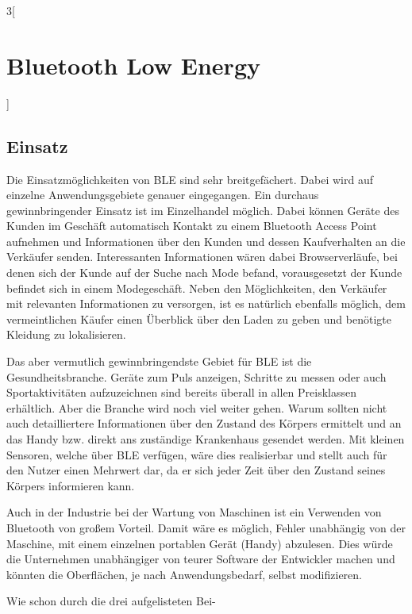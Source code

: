 \begin{multicols}{3}[\section{Bluetooth Low Energy}]
\subsection*{Einsatz}
Die Einsatzmöglichkeiten von BLE sind sehr breitgefächert. Dabei wird auf einzelne Anwendungsgebiete genauer eingegangen. Ein durchaus gewinnbringender Einsatz ist im Einzelhandel möglich. Dabei können Geräte des Kunden im Geschäft automatisch Kontakt zu einem Bluetooth Access Point aufnehmen und Informationen über den Kunden und dessen Kaufverhalten an die Verkäufer senden. Interessanten Informationen wären dabei Browserverläufe, bei denen sich der Kunde auf der Suche nach Mode befand, vorausgesetzt der Kunde befindet sich in einem Modegeschäft. Neben den Möglichkeiten, den Verkäufer mit relevanten Informationen zu versorgen, ist es natürlich ebenfalls möglich, dem vermeintlichen Käufer einen Überblick über den Laden zu geben und benötigte Kleidung zu lokalisieren.

Das aber vermutlich gewinnbringendste Gebiet für BLE ist die Gesundheitsbranche. Geräte zum Puls anzeigen, Schritte zu messen oder auch Sportaktivitäten aufzuzeichnen sind bereits überall in allen Preisklassen erhältlich. Aber die Branche wird noch viel weiter gehen. Warum sollten nicht auch detailliertere Informationen über den Zustand des Körpers ermittelt und an das Handy bzw. direkt ans zuständige Krankenhaus gesendet werden. Mit kleinen Sensoren, welche über BLE verfügen, wäre dies realisierbar und stellt auch für den Nutzer einen Mehrwert dar, da er sich jeder Zeit über den Zustand seines Körpers informieren kann.

Auch in der Industrie bei der Wartung von Maschinen ist ein Verwenden von Bluetooth von großem Vorteil. Damit wäre es möglich, Fehler unabhängig von der Maschine, mit einem einzelnen portablen Gerät (Handy) abzulesen. Dies würde die Unternehmen unabhängiger von teurer Software der Entwickler machen und könnten die Oberflächen, je nach Anwendungsbedarf, selbst modifizieren.

Wie schon durch die drei aufgelisteten Bei-

\end{multicols}


